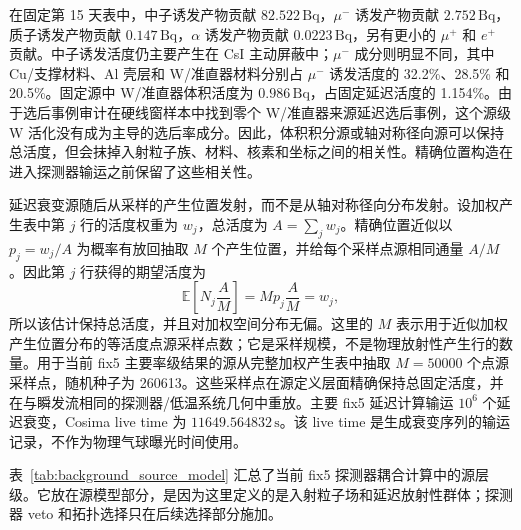 \documentclass[preprint,12pt]{elsarticle}
\begin{document}
在固定第 15 天表中，中子诱发产物贡献 $82.522\,\mathrm{Bq}$，$\mu^-$ 诱发产物贡献 $2.752\,\mathrm{Bq}$，质子诱发产物贡献 $0.147\,\mathrm{Bq}$，$\alpha$ 诱发产物贡献 $0.0223\,\mathrm{Bq}$，另有更小的 $\mu^+$ 和 $e^+$ 贡献。中子诱发活度仍主要产生在 CsI 主动屏蔽中；$\mu^-$ 成分则明显不同，其中 Cu/支撑材料、Al 壳层和 W/准直器材料分别占 $\mu^-$ 诱发活度的 32.2\%、28.5\% 和 20.5\%。固定源中 W/准直器体积活度为 $0.986\,\mathrm{Bq}$，占固定延迟活度的 1.154\%。由于选后事例审计在硬线窗样本中找到零个 W/准直器来源延迟选后事例，这个源级 W 活化没有成为主导的选后率成分。因此，体积积分源或轴对称径向源可以保持总活度，但会抹掉入射粒子族、材料、核素和坐标之间的相关性。精确位置构造在进入探测器输运之前保留了这些相关性。

延迟衰变源随后从采样的产生位置发射，而不是从轴对称径向分布发射。设加权产生表中第 $j$ 行的活度权重为 $w_j$，总活度为 $A=\sum_j w_j$。精确位置近似以 $p_j=w_j/A$ 为概率有放回抽取 $M$ 个产生位置，并给每个采样点源相同通量 $A/M$。因此第 $j$ 行获得的期望活度为
\begin{equation}
  \mathbb{E}\!\left[N_j\frac{A}{M}\right] = M p_j \frac{A}{M} = w_j ,
\end{equation}
所以该估计保持总活度，并且对加权空间分布无偏。这里的 $M$ 表示用于近似加权产生位置分布的等活度点源采样点数；它是采样规模，不是物理放射性产生行的数量。用于当前 fix5 主要率级结果的源从完整加权产生表中抽取 $M=50000$ 个点源采样点，随机种子为 260613。这些采样点在源定义层面精确保持总固定活度，并在与瞬发流相同的探测器/低温系统几何中重放。主要 fix5 延迟计算输运 $10^6$ 个延迟衰变，Cosima live time 为 $11649.564832\,\mathrm{s}$。该 live time 是生成衰变序列的输运记录，不作为物理气球曝光时间使用。

表~\ref{tab:background_source_model} 汇总了当前 fix5 探测器耦合计算中的源层级。它放在源模型部分，是因为这里定义的是入射粒子场和延迟放射性群体；探测器 veto 和拓扑选择只在后续选择部分施加。
\end{document}
